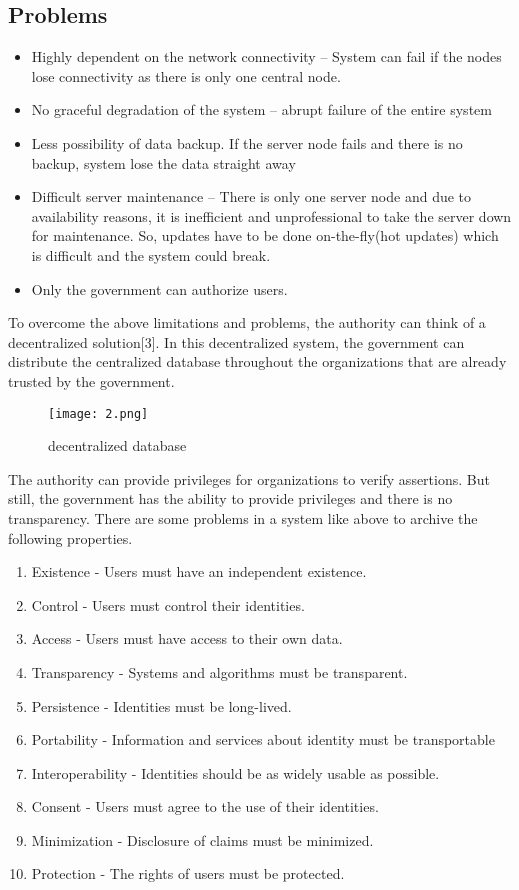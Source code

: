   \subsection{Problems}

  \begin{itemize}
    \item Highly dependent on the network connectivity – System can fail if the nodes lose connectivity as there is only one central node.
    \item No graceful degradation of the system – abrupt failure of the entire system
    \item Less possibility of data backup. If the server node fails and there is no backup, system lose the data straight away
    \item Difficult server maintenance – There is only one server node and due to availability reasons, it is inefficient and unprofessional to take the server down for maintenance. So, updates have to be done on-the-fly(hot updates) which is difficult and the system could break.
    \item Only the government can authorize users.
  \end{itemize}

  To overcome the above limitations and problems, the authority can think of a decentralized solution[3]. 
  In this decentralized system, the government can distribute the centralized database throughout the 
  organizations that are already trusted by the government.

  \begin{figure}[H]
    \centering
    \texttt{[image: 2.png]}
    \caption{decentralized database}
    \label{fig:threshold}
  \end{figure}

  The authority can provide privileges for organizations to verify assertions. But still, the 
  government has the ability to provide privileges and there is no transparency. There are some 
  problems in a system like above to archive the following properties.

  \begin{enumerate}
      \item Existence - Users must have an independent existence.
      \item Control -  Users must control their identities.
      \item Access - Users must have access to their own data.
      \item Transparency - Systems and algorithms must be transparent.
      \item Persistence - Identities must be long-lived.
      \item Portability - Information and services about identity must be transportable
      \item Interoperability - Identities should be as widely usable as possible.
      \item Consent - Users must agree to the use of their identities.
      \item Minimization - Disclosure of claims must be minimized.
      \item Protection - The rights of users must be protected.
  \end{enumerate}

